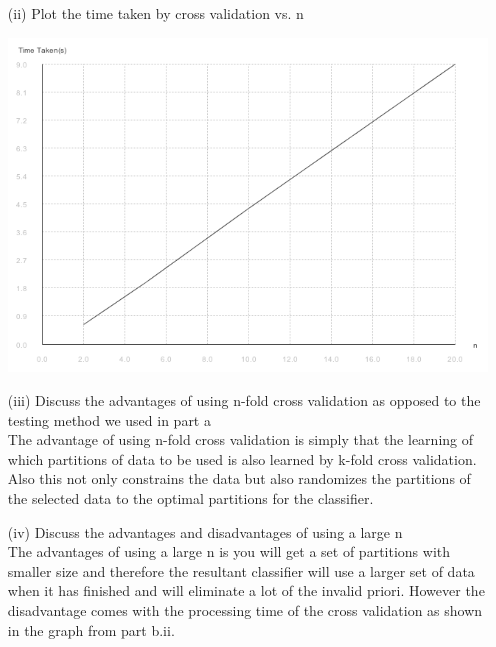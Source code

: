\begin{enumerate}
\begin{enumerate}
\begin{enumerate}
					\item[(ii)] Plot the time taken by cross validation vs. n
					
						\includegraphics[scale=0.5]{p1b-ii-graph}
					
					\item[(iii)] Discuss the advantages of using n-fold cross validation as opposed to the testing method we used in part a \\
					
					The advantage of using n-fold cross validation is simply that the learning of which partitions of data to be used is also learned by k-fold cross validation.  Also this not only constrains the data but also randomizes the partitions of the selected data to the optimal partitions for the classifier.
					
					\item[(iv)] Discuss the advantages and disadvantages of using a large n \\
					
					The advantages of using a large n is you will get a set of partitions with smaller size and therefore the resultant classifier will use a larger set of data when it has finished and will eliminate a lot of the invalid priori.  However the disadvantage comes with the processing time of the cross validation as shown in the graph from part b.ii.
					
					
				\end{enumerate}
						
		\end{enumerate}	 	

\end{enumerate}

